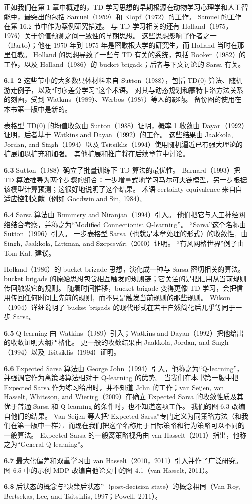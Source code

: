 \documentclass[UTF8,12pt,a4paper,fontset=fandol]{ctexart}
\begin{document}
正如我们在第 1 章中概述的，TD 学习思想的早期根源在动物学习心理学和人工智能中，最突出的包括 Samuel（1959）和 Klopf（1972）的工作。
Samuel 的工作在第 16.2 节中作为案例研究描述。
与 TD 学习相关的还有 Holland（1975，1976）关于价值预测之间一致性的早期思想。
这些思想影响了作者之一（Barto）；他在 1970 年到 1975 年是密歇根大学的研究生，而 Holland 当时在那里任教。
Holland 的思想导致了一些与 TD 有关的系统，包括 Booker（1982）的工作，以及 Holland（1986）的 bucket brigade；后者与下文讨论的 Sarsa 有关。

\noindent\textbf{6.1--2}
这些节中的大多数具体材料来自 Sutton（1988），包括 TD(0) 算法、随机游走例子，以及“时序差分学习”这个术语。
对其与动态规划和蒙特卡洛方法关系的刻画，受到 Watkins（1989）、Werbos（1987）等人的影响。
备份图的使用在本书第一版中是新的。

表格型 TD(0) 的均值收敛由 Sutton（1988）证明，概率 1 收敛由 Dayan（1992）证明，后者基于 Watkins and Dayan（1992）的工作。
这些结果由 Jaakkola, Jordan, and Singh（1994）以及 Tsitsiklis（1994）使用随机逼近已有强大理论的扩展加以扩充和加强。
其他扩展和推广将在后续章节中讨论。

\noindent\textbf{6.3}
Sutton（1988）确立了批量训练下 TD 算法的最优性。
Barnard（1993）把 TD 算法推导为两个步骤的组合：一步增量式地学习马尔可夫链模型，另一步根据该模型计算预测；这很好地说明了这个结果。
术语 certainty equivalence 来自自适应控制文献（例如 Goodwin and Sin, 1984）。

\noindent\textbf{6.4}
Sarsa 算法由 Rummery and Niranjan（1994）引入。
他们把它与人工神经网络结合考察，并称之为“Modified Connectionist Q-learning”。
“Sarsa”这个名称由 Sutton（1996）引入。
一步表格型 Sarsa（也就是本章处理的形式）的收敛性，由 Singh, Jaakkola, Littman, and Szepesvári（2000）证明。
“有风网格世界”例子由 Tom Kalt 建议。

Holland（1986）的 bucket brigade 思想，演化成一种与 Sarsa 密切相关的算法。
bucket brigade 的原始思想包含相互触发的规则链；它关注的是把信用从当前规则传回触发它的规则。
随着时间推移，bucket brigade 变得更像 TD 学习，会把信用传回任何时间上先前的规则，而不只是触发当前规则的那些规则。
Wilson（1994）详细说明了 bucket brigade 的现代形式在若干自然简化后几乎等同于一步 Sarsa。

\noindent\textbf{6.5}
Q-learning 由 Watkins（1989）引入；Watkins and Dayan（1992）把他给出的收敛证明大纲严格化。
更一般的收敛结果由 Jaakkola, Jordan, and Singh（1994）以及 Tsitsiklis（1994）证明。

\noindent\textbf{6.6}
Expected Sarsa 算法由 George John（1994）引入，他称之为“Q-learning”，并强调它作为离策略算法相对于 Q-learning 的优势。
当我们在本书第一版中把 Expected Sarsa 作为练习给出时，并不知道 John 的工作；van Seijen, van Hasselt, Whiteson, and Wiering（2009）在确立 Expected Sarsa 的收敛性质及其优于普通 Sarsa 和 Q-learning 的条件时，也不知道这项工作。
我们的图 6.3 改编自他们的结果。
Van Seijen 等人把“Expected Sarsa”专门定义为同策略方法（和我们在第一版中一样），而现在我们把这个名称用于目标策略和行为策略可以不同的一般算法。
Expected Sarsa 的一般离策略视角由 van Hasselt（2011）指出，他称之为“General Q-learning”。

\noindent\textbf{6.7}
最大化偏差和双重学习由 van Hasselt（2010，2011）引入并作了广泛研究。
图 6.5 中的示例 MDP 改编自他论文中的图 4.1（van Hasselt, 2011）。

\noindent\textbf{6.8}
后状态的概念与“决策后状态”（post-decision state）的概念相同（Van Roy, Bertsekas, Lee, and Tsitsiklis, 1997；Powell, 2011）。
\end{document}
